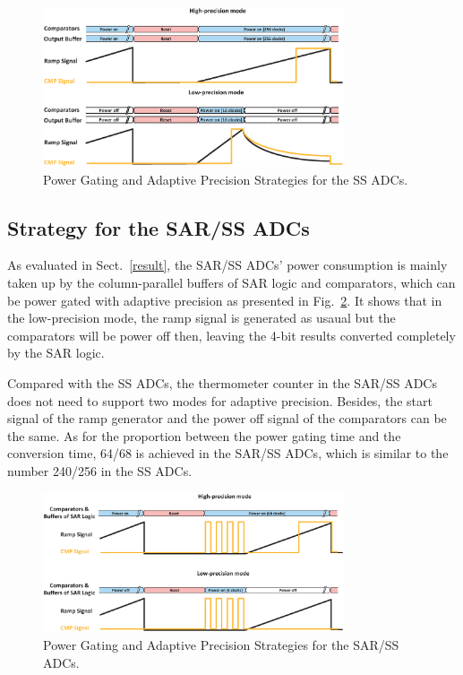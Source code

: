 \documentclass[conference]{IEEEtran}
\begin{document}
\begin{figure}[htbp]
	\centerline{\includegraphics[width=3.5in]{./Figures/SS_pg.eps}}
	\caption{Power Gating and Adaptive Precision Strategies for the SS ADCs.}
	\label{SS_pg}
\end{figure} 

\subsection{Strategy for the SAR/SS ADCs}
As evaluated in Sect.~\ref{result}, the SAR/SS ADCs’ power consumption is mainly taken up by the column-parallel buffers of SAR logic and comparators, which can be power gated with adaptive precision as presented in Fig.~\ref{SAR_pg}. It shows that in the low-precision mode, the ramp signal is generated as usaual but the comparators will be power off then, leaving the 4-bit results converted completely by the SAR logic. 

Compared with the SS ADCs, the thermometer counter in the SAR/SS ADCs does not need to support two modes for adaptive precision. Besides, the start signal of the ramp generator and the power off signal of the comparators can be the same. As for the proportion between the power gating time and the conversion time, 64/68 is achieved in the SAR/SS ADCs, which is similar to the number 240/256 in the SS ADCs.

\begin{figure}[htbp]
	\centerline{\includegraphics[width=3.5in]{./Figures/SAR_pg.eps}}
	\caption{Power Gating and Adaptive Precision Strategies for the SAR/SS ADCs.}
	\label{SAR_pg}
\end{figure} 
\end{document}
